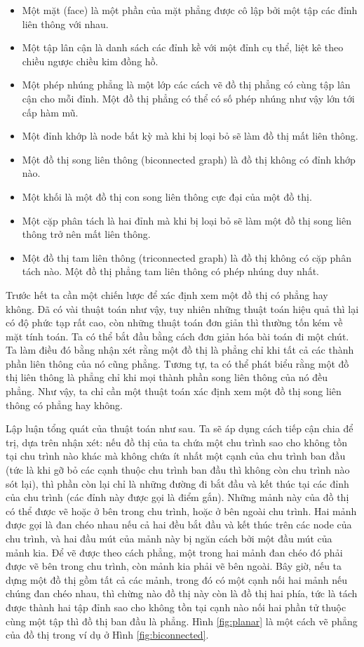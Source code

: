 \documentclass[12pt,a4paper, openany]{book}
\begin{document}
\begin{itemize}
    \item Một mặt (face) là một phần của mặt phẳng được cô lập bởi một tập các đỉnh liên thông với nhau.
    \item Một tập lân cận là danh sách các đỉnh kề với một đỉnh cụ thể, liệt kê theo chiều ngược chiều kim đồng hồ.
    \item Một phép nhúng phẳng là một lớp các cách vẽ đồ thị phẳng có cùng tập lân cận cho mỗi đỉnh. Một đồ thị phẳng có thể có số phép nhúng như vậy lớn tới cấp hàm mũ.
    \item Một đỉnh khớp là node bất kỳ mà khi bị loại bỏ sẽ làm đồ thị mất liên thông.
    \item Một đồ thị song liên thông (biconnected graph) là đồ thị không có đỉnh khớp nào.
    \item Một khối là một đồ thị con song liên thông cực đại của một đồ thị.
    \item Một cặp phân tách là hai đỉnh mà khi bị loại bỏ sẽ làm một đồ thị song liên thông trở nên mất liên thông.
    \item Một đồ thị tam liên thông (triconnected graph) là đồ thị không có cặp phân tách nào. Một đồ thị phẳng tam liên thông có phép nhúng duy nhất.
\end{itemize}

Trước hết ta cần một chiến lược để xác định xem một đồ thị có phẳng hay không. Đã có vài thuật toán như vậy, tuy nhiên những thuật toán hiệu quả thì lại có độ phức tạp rất cao, còn những thuật toán đơn giản thì thường tốn kém về mặt tính toán. Ta có thể bắt đầu bằng cách đơn giản hóa bài toán đi một chút. Ta làm điều đó bằng nhận xét rằng một đồ thị là phẳng chỉ khi tất cả các thành phần liên thông của nó cũng phẳng. Tương tự, ta có thể phát biểu rằng một đồ thị liên thông là phẳng chỉ khi mọi thành phần song liên thông của nó đều phẳng. Như vậy, ta chỉ cần một thuật toán xác định xem một đồ thị song liên thông có phẳng hay không.

Lập luận tổng quát của thuật toán như sau. Ta sẽ áp dụng cách tiếp cận chia để trị, dựa trên nhận xét: nếu đồ thị của ta chứa một chu trình sao cho không tồn tại chu trình nào khác mà không chứa ít nhất một cạnh của chu trình ban đầu (tức là khi gỡ bỏ các cạnh thuộc chu trình ban đầu thì không còn chu trình nào sót lại), thì phần còn lại chỉ là những đường đi bắt đầu và kết thúc tại các đỉnh của chu trình (các đỉnh này được gọi là điểm gắn). Những mảnh này của đồ thị có thể được vẽ hoặc ở bên trong chu trình, hoặc ở bên ngoài chu trình. Hai mảnh được gọi là đan chéo nhau nếu cả hai đều bắt đầu và kết thúc trên các node của chu trình, và hai đầu mút của mảnh này bị ngăn cách bởi một đầu mút của mảnh kia. Để vẽ được theo cách phẳng, một trong hai mảnh đan chéo đó phải được vẽ bên trong chu trình, còn mảnh kia phải vẽ bên ngoài. Bây giờ, nếu ta dựng một đồ thị gồm tất cả các mảnh, trong đó có một cạnh nối hai mảnh nếu chúng đan chéo nhau, thì chừng nào đồ thị này còn là đồ thị hai phía, tức là tách được thành hai tập đỉnh sao cho không tồn tại cạnh nào nối hai phần tử thuộc cùng một tập thì đồ thị ban đầu là phẳng. Hình \ref{fig:planar} là một cách vẽ phẳng của đồ thị trong ví dụ ở Hình \ref{fig:biconnected}.
\end{document}
